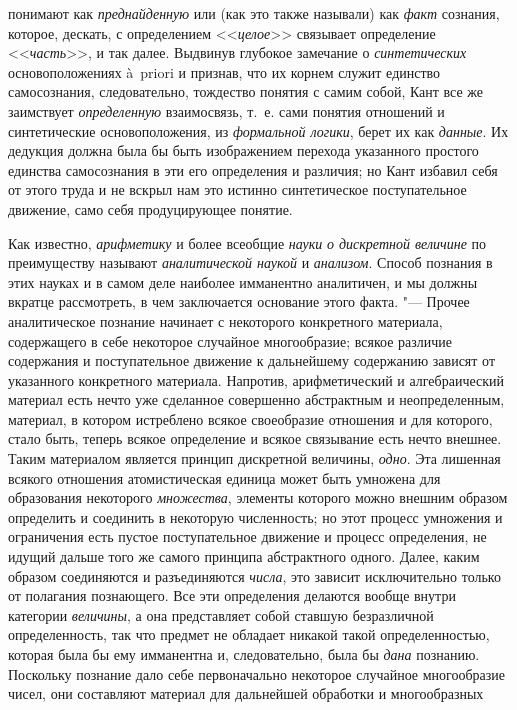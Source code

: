 {{понимают как {\em преднайденную}
или (как это также называли) как
{\em факт} сознания,
которое, дескать, с определением
<<{\em целое}>> связывает
определение <<{\em часть}>>,
и так далее. Выдвинув глубокое замечание о
{\em синтетических}
основоположениях à~priori и признав, что их корнем служит
единство самосознания, следовательно, тождество понятия с самим собой, Кант
все же заимствует {\em определенную}
взаимосвязь, т.~е. сами понятия отношений и синтетические
основоположения, из {\em формальной
логики}, берет их как
{\em данные}. Их дедукция
должна была бы быть изображением перехода указанного простого единства
самосознания в эти его определения и различия; но Кант избавил себя от
этого труда и не вскрыл нам это истинно синтетическое поступательное
движение, само себя продуцирующее понятие.

Как известно,
{\em арифметику} и более
всеобщие {\em науки}
{\em о дискретной величине}
по преимуществу называют
{\em аналитической наукой}
и {\em анализом}.
Способ познания в этих науках и в самом деле наиболее
имманентно аналитичен, и мы должны вкратце рассмотреть, в чем заключается
основание этого факта. "--- Прочее аналитическое познание
начинает с некоторого конкретного материала, содержащего в себе некоторое
случайное многообразие; всякое различие содержания и поступательное
движение к дальнейшему содержанию зависят от указанного конкретного
материала. Напротив, арифметический и алгебраический материал есть нечто
уже сделанное совершенно абстрактным и неопределенным, материал, в котором
истреблено всякое своеобразие отношения и для которого, стало быть, теперь
всякое определение и всякое связывание есть нечто внешнее. Таким
материалом является принцип дискретной величины,
{\em одно}. Эта лишенная
всякого отношения атомистическая единица может быть умножена для
образования некоторого {\em множества},
элементы которого можно внешним образом определить и
соединить в некоторую численность; но этот процесс умножения и ограничения
есть пустое поступательное движение и процесс определения, не идущий дальше
того же самого принципа абстрактного одного. Далее, каким образом
соединяются и разъединяются
{\em числа}, это зависит
исключительно только от полагания познающего. Все эти определения делаются
вообще внутри категории {\em величины},
а она представляет собой ставшую безразличной определенность,
так что предмет не обладает никакой такой определенностью, которая была бы
ему имманентна и, следовательно, была бы
{\em дана} познанию.
Поскольку познание дало себе первоначально некоторое случайное многообразие
чисел, они составляют материал для дальнейшей обработки и многообразных
}}
